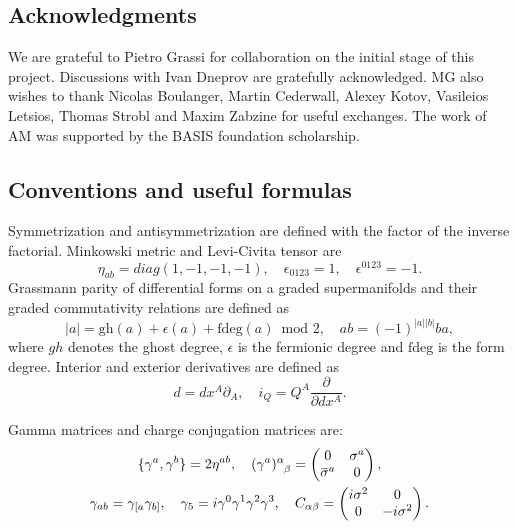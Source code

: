 \documentclass[a4paper,12pt]{article}
\newcommand{\maxim}[1]{\textsc{#1}}
\numberwithin{equation}{section} %
\newcommand{\p}[1]{|#1|}
\newcommand{\gh}[1]{\mathrm{gh}(#1)}
\numberwithin{equation}{section}
\newcommand{\overbar}[1]{\mkern 1.5mu\overline{\mkern-1.5mu#1\mkern-1.5mu}\mkern 1.5mu}
\newcommand{\sigmabar}{\overbar{\sigma}}
\begin{document}

\subsection*{Acknowledgments}

We are grateful to  Pietro Grassi for collaboration on the initial stage of this project. Discussions with Ivan Dneprov are gratefully acknowledged.  MG also wishes to thank Nicolas Boulanger, Martin Cederwall, Alexey Kotov, Vasileios Letsios, Thomas Strobl and  Maxim Zabzine for useful exchanges. The work of AM was supported by the BASIS foundation scholarship.

\begin{appendix}
\section{Conventions and useful formulas}
\label{sec:app-conventions}
Symmetrization and antisymmetrization are defined with the factor of the inverse factorial. Minkowski metric and Levi-Civita tensor are 
\begin{equation}
    \eta_{ab} = diag(1,-1,-1,-1), \quad \epsilon_{0123} =1, \quad \epsilon^{0123}=-1.
\end{equation}
Grassmann parity of differential forms on a graded supermanifolds 
and their graded commutativity relations are defined as
\begin{equation}
    \p{a} = \gh{a} + \epsilon(a) + \mathrm{fdeg}(a) \enspace \mathrm{mod}\,\, 2, \quad ab = (-1)^{\p{a}\p{b}}ba,
\end{equation}
where $gh$ denotes the ghost degree, $\epsilon$ is the fermionic degree and $\mathrm{fdeg}$ is the form degree.  Interior and exterior derivatives are defined as
\begin{equation}
    d = dx^A\partial_A, \quad i_Q = Q^A\frac{\partial}{\partial dx^A}.
\end{equation}

Gamma matrices and charge conjugation matrices are:
\begin{equation}
\begin{gathered}
    \{\gamma^a,\gamma^b\} = 2\eta^{ab}, \quad 
    (\gamma^a)^\alpha_{\enspace\beta}=\begin{pmatrix}
        0 & \sigma^a\\
        \sigmabar^a & 0
    \end{pmatrix}, \\
    \gamma_{ab} = \gamma_{[a}\gamma_{b]}, \quad \gamma_5 = i\gamma^0\gamma^1 \gamma^2\gamma^3, \quad C_{\alpha\beta} = \begin{pmatrix}
        i\sigma^2 & 0\\
        0 & -i\sigma^2
    \end{pmatrix}.
\end{gathered}
\end{equation}


\end{appendix}
\end{document}
